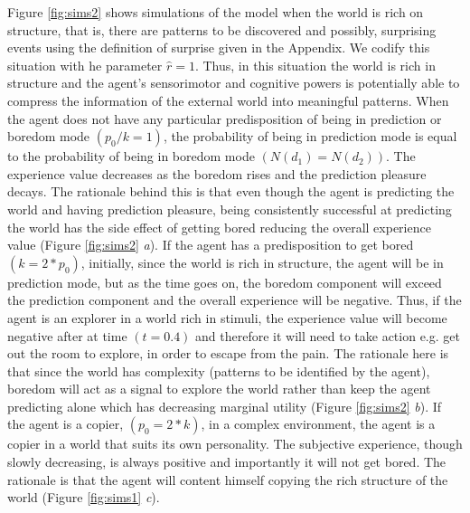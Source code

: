 \documentclass[11pt, onecolumn]{article}
\begin{document}
Figure \ref{fig:sims2} shows simulations of the model when the world is rich on structure, that is, there are patterns to be discovered and possibly, surprising events using the definition of surprise given in the Appendix. We codify this situation with he parameter $\hat{r} = 1$. Thus, in this situation the world is rich in structure and the agent's sensorimotor and cognitive powers is potentially  able to compress the information of the external world into meaningful patterns. 
When the agent does not have any particular predisposition of being in prediction or boredom mode $(p_0/ k =1)$, the probability of being in prediction mode is equal to the probability of being in boredom mode $(N(d_1) = N(d_2))$. The experience value decreases as the boredom rises and the prediction pleasure decays. The rationale behind this is that even though the agent is predicting the world and having prediction pleasure, being consistently successful at predicting the world has the side effect of getting bored reducing the overall experience value (Figure \ref{fig:sims2} \emph{a}). %
If the agent has a predisposition to get bored $(k = 2*p_0)$, initially, since the world is rich in structure, the agent will be in prediction mode, but as the time goes on, the boredom component will exceed the prediction component and the overall experience will be negative. Thus, if the agent is an explorer in a world rich in stimuli, the experience value will become negative after at time $(t = 0.4)$ and therefore it will need to take action e.g. get out the room to explore, in order to escape from the pain. The rationale here is that since the world has complexity (patterns to be identified by the agent), boredom will act as a signal to explore the world rather than keep the agent predicting alone which has decreasing marginal utility (Figure \ref{fig:sims2} \emph{b}). %
If the agent is a copier, $(p_0 = 2*k)$, in a complex environment, the agent is a copier in a world that suits its own personality. The subjective experience, though slowly decreasing, is always positive and importantly it will not get bored. The rationale is that the agent will content himself copying the rich structure of the world (Figure \ref{fig:sims1} \emph{c}). %
\end{document}

